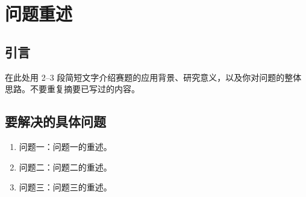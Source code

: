 \section{问题重述}

\subsection{引言}

在此处用 2--3 段简短文字介绍赛题的应用背景、研究意义，以及你对问题的整体思路。不要重复摘要已写过的内容。

\subsection{要解决的具体问题}

\begin{enumerate}
  \item 问题一：问题一的重述。
  \item 问题二：问题二的重述。
  \item 问题三：问题三的重述。
\end{enumerate}
